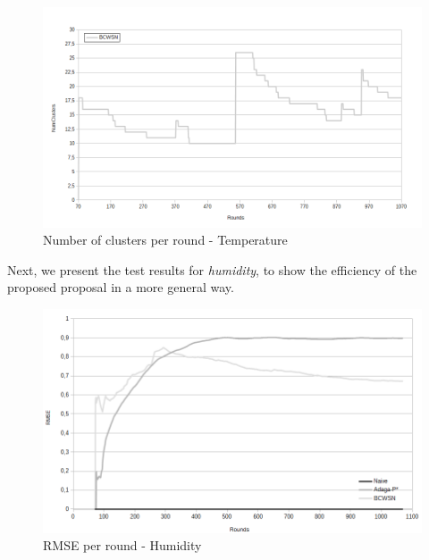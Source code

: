 \documentclass{acm_proc_article-sp}
\begin{document}
\begin{figure}[!htb]
\begin{center}
	\includegraphics[scale=0.32]{BCWSN-NumClustersxRound-PB.png}
	 \vspace*{-.6cm}
    \caption{Number of clusters per round - Temperature}
    \label{fig:num-clts}
\end{center}
\end{figure}

Next, we present the test results for {\it humidity}, to show the efficiency of the
proposed proposal in a more general way.
\vspace*{-.3cm}

\begin{figure}[!htb]
\begin{center}
	\includegraphics[scale=0.28]{BCWSN-RMSExRound-BW-Hum.png}
	 \vspace*{-.6cm}
    \caption{RMSE per round - Humidity}
    \label{fig:rmse-hum}
\end{center}
\end{figure}
\end{document}
